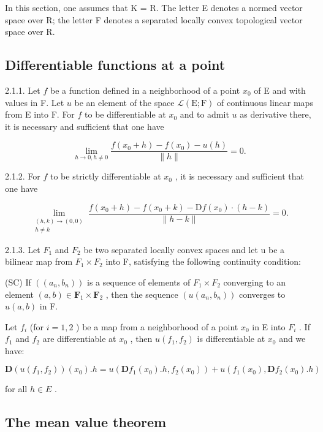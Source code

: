 In this section, one assumes that K = R. The letter E denotes a normed vector space over R; the letter F denotes a separated locally convex topological vector space over R.

\subsection{Differentiable functions at a point}

2.1.1. Let \(f\) be a function defined in a neighborhood of a point \(x_{0}\) of E and with values in F. Let \(u\) be an element of the space \(\mathcal{L}(\mathrm{E};\mathrm{F})\) of continuous linear maps from E into F. For \(f\) to be differentiable at \(x_{0}\) and to admit \(u\) as derivative there, it is necessary and sufficient that one have

\[
\lim _ {h \rightarrow 0, h \neq 0} \frac {f (x _ {0} + h) - f (x _ {0}) - u (h)}{\| h \|} = 0.
\]

2.1.2. For \(f\) to be strictly differentiable at \(x_{0}\) , it is necessary and sufficient that one have

\[
\lim_{\substack{(h,k)\to (0,0)\\ h\neq k}}\frac{f(x_{0} + h) - f(x_{0} + k) - \mathrm{D}f(x_{0})\cdot(h - k)}{\|h - k\|} = 0.
\]

2.1.3. Let \(F_{1}\) and \(F_{2}\) be two separated locally convex spaces and let u be a bilinear map from \(F_{1} \times F_{2}\) into F, satisfying the following continuity condition:

(SC) If \(((a_{n}, b_{n}))\) is a sequence of elements of \(F_{1} \times F_{2}\) converging to an element \((a, b) \in \mathbf{F}_{1} \times \mathbf{F}_{2}\) , then the sequence \((u(a_{n}, b_{n}))\) converges to \(u(a, b)\) in F.

Let \(f_{i}\) (for \(i = 1, 2\) ) be a map from a neighborhood of a point \(x_{0}\) in E into \(F_{i}\) . If \(f_{1}\) and \(f_{2}\) are differentiable at \(x_{0}\) , then \(u(f_{1}, f_{2})\) is differentiable at \(x_{0}\) and we have:

\[
\mathbf {D} (u (f _ {1}, f _ {2})) (x _ {0}). h = u (\mathbf {D} f _ {1} (x _ {0}). h, f _ {2} (x _ {0})) + u (f _ {1} (x _ {0}), \mathbf {D} f _ {2} (x _ {0}). h)
\]

for all \(h \in E\) .

\subsection{The mean value theorem}

